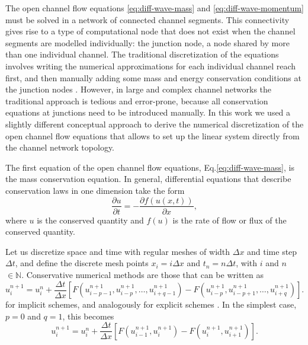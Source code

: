 \documentclass[bg, manuscript]{copernicus}
\begin{document}
The open channel flow equations \eqref{eq:diff-wave-mass} and \eqref{eq:diff-wave-momentum} must be solved in a  network of connected channel segments.
This connectivity gives rise to a  type of computational node that does not exist when the channel segments are modelled individually: the junction node, a node shared by more than one individual channel. 
The traditional discretization of the equations  involves writing the numerical approximations for each individual channel reach first, and then manually adding some mass and energy conservation conditions at the junction nodes \citep{cungePracticalAspectsComputational1980, szymkiewiczNumericalModelingOpen2010}.
However, in large and complex channel networks the traditional approach is tedious and error-prone, because all conservation equations at junctions need to   be introduced manually.
In this work we used a slightly different conceptual approach to derive the numerical discretization of the open channel flow equations that allows to set up the linear system directly from the channel network topology.

The first equation of the open channel flow equations, Eq.\eqref{eq:diff-wave-mass}, is the mass conservation equation.
In general, differential equations that describe conservation laws in one dimension take the form
\begin{equation} \label{eq:conservation_pde}
\frac{\partial u}{\partial t} =-\frac{\partial f(u(x,t))}{\partial x},
\end{equation}
where $u$ is the conserved quantity and $f(u)$ is the rate of flow or flux  of the conserved quantity.

Let us discretize space and time with regular meshes of width $\Delta x$ and time step $\Delta t$, and define the discrete mesh points $x_i=i\Delta x$ and $t_n=n\Delta t$, with $i$ and $n$ $\in \mathbb{N}$.
Conservative numerical methods are those that can be written as
\begin{equation} \label{eq:general-discretization-consesrvative-pde}
u_i^{n+1} = u_i^n + \frac{\Delta t}{\Delta x} \left[F(u^{n+1}_{i-p-1}, u^{n+1}_{i-p}, \dots, u^{n+1}_{i+q-1}) - F(u^{n+1}_{i-p}, u^{n+1}_{i-p+1}, \dots, u^{n+1}_{i+q})\right]. 
\end{equation}
for implicit schemes, and analogously for explicit schemes \citep{levequeNumericalMethodsConservation1992}.
In the simplest case, $p = 0$ and $q=1$, this becomes
\begin{equation} \label{eq:simplest-conservative-num-method}
u_i^{n+1} = u_i^n + \frac{\Delta t}{\Delta x} \left[F(u^{n+1}_{i-1}, u^{n+1}_{i}) - F(u^{n+1}_{i}, u^{n+1}_{i+1})\right].
\end{equation}
\end{document}

